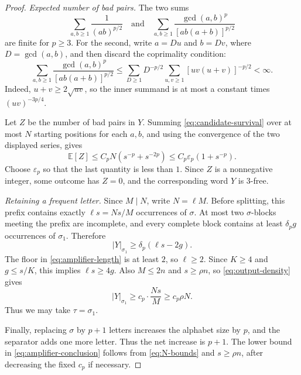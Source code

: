 \documentclass[10pt,a4paper]{amsart}
\newcommand{\E}{\mathbb E}
\begin{document}
\begin{proof}
\emph{Expected number of bad pairs.}
The two sums
\begin{equation}\label{eq:summable-series}
 \sum_{a,b\ge1}\frac{1}{(ab)^{p/2}}
 \quad\text{and}\quad
 \sum_{a,b\ge1}
 \frac{\gcd(a,b)^p}{[ab(a+b)]^{p/2}}
\end{equation}
are finite for $p\ge3$. For the second, write $a=Du$ and $b=Dv$, where $D=\gcd(a,b)$, and then discard the coprimality condition:
\[
 \sum_{a,b\ge1}
 \frac{\gcd(a,b)^p}{[ab(a+b)]^{p/2}}
 \le
 \sum_{D\ge1}D^{-p/2}
 \sum_{u,v\ge1}[uv(u+v)]^{-p/2}<\infty.
\]
Indeed, $u+v\ge2\sqrt{uv}$, so the inner summand is at most a constant times $(uv)^{-3p/4}$.

Let \(Z\) be the number of bad pairs in \(Y\). Summing \eqref{eq:candidate-survival} over at most \(N\) starting positions for each \(a,b\), and using the convergence of the two displayed series, gives
\begin{equation}\label{eq:expected-bad-pairs}
        \E \left[Z\right]
        \le C_pN(s^{-p}+s^{-2p})
        \le C_p\varepsilon_p(1+s^{-p}).
\end{equation}
Choose \(\varepsilon_p\) so that the last quantity is less than \(1\). Since \(Z\) is a nonnegative integer, some outcome has \(Z=0\), and the corresponding word \(Y\) is 3-free.

\emph{Retaining a frequent letter.}
Since $M\mid N$, write $N=\ell M$. Before splitting, this prefix contains exactly \(\ell s=Ns/M\) occurrences of \(\sigma\). At most two \(\sigma\)-blocks meeting the prefix are incomplete, and every complete block contains at least $\delta_pg$ occurrences of $\sigma_1$. Therefore
\begin{equation}\label{eq:output-density}
        |Y|_{\sigma_1}
        \ge \delta_p(\ell s-2g).
\end{equation}
The floor in \eqref{eq:amplifier-length} is at least \(2\), so \(\ell\ge2\). Since \(K\ge4\) and \(g\le s/K\), this implies \(\ell s\ge4g\). Also \(M\le2n\) and \(s\ge\rho n\), so \eqref{eq:output-density} gives
\[
        |Y|_{\sigma_1}
        \ge c_p\cdot\frac{Ns}{M}
        \ge c_p\rho N.
\]
Thus we may take $\tau=\sigma_1$.

Finally, replacing \(\sigma\) by \(p+1\) letters increases the alphabet size by \(p\), and the separator adds one more letter. Thus the net increase is \(p+1\). The lower bound in \eqref{eq:amplifier-conclusion} follows from \eqref{eq:N-bounds} and \(s\ge\rho n\), after decreasing the fixed \(c_p\) if necessary.
\end{proof}
\end{document}
